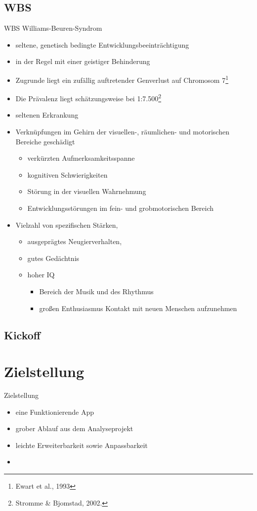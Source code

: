\documentclass[10pt,fleqn]{beamer}
\begin{document}
\subsection{WBS}
	\begin{frame}[t]{WBS Williams-Beuren-Syndrom}
		\begin{itemize}
			\item seltene, genetisch bedingte Entwicklungsbeeinträchtigung
			\item in der Regel mit einer geistiger Behinderung
			\item Zugrunde liegt ein zufällig auftretender Genverlust auf Chromosom 7\footnote{Ewart et al., 1993} 
			\item Die Prävalenz liegt schätzungsweise bei 1:7.500\footnote{Stromme \& Bjomstad, 2002.}
			\item seltenen Erkrankung
			\item Verknüpfungen im Gehirn der visuellen-, räumlichen- und motorischen Bereiche geschädigt
			\begin{itemize}
				\item verkürzten Aufmerksamkeitsspanne
				\item kognitiven Schwierigkeiten
				\item Störung in der visuellen Wahrnehmung
				\item Entwicklungsstörungen im fein- und grobmotorischen Bereich
			\end{itemize}
			\item Vielzahl von spezifischen Stärken,
			\begin{itemize}
				\item ausgeprägtes Neugierverhalten,
				\item gutes Gedächtnis
				\item hoher IQ
				\begin{itemize}
					\item Bereich der Musik und des Rhythmus
					\item großen Enthusiasmus Kontakt mit neuen Menschen aufzunehmen
				\end{itemize} 
			\end{itemize} 
		\end{itemize}
	\end{frame}

\subsection{Kickoff}

\section{Zielstellung}
\begin{frame}[t]{Zielstellung}
	\begin{itemize}
		\item eine Funktionierende App
		\item grober Ablauf aus dem Analyseprojekt
		\item leichte Erweiterbarkeit sowie Anpassbarkeit
		\item 
	\end{itemize}
\end{frame}
\end{document}
